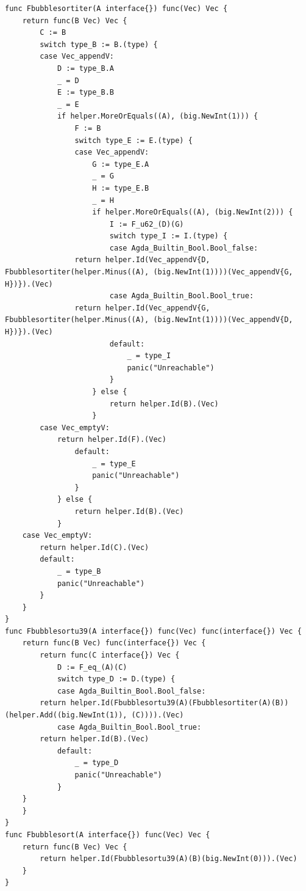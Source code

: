 \documentclass{VUMIFPSkursinis}
\begin{document}
\begin{lstlisting}[language=GoCust]
func Fbubblesortiter(A interface{}) func(Vec) Vec {
	return func(B Vec) Vec {
		C := B
		switch type_B := B.(type) {
		case Vec_appendV:
			D := type_B.A
			_ = D
			E := type_B.B
			_ = E
			if helper.MoreOrEquals((A), (big.NewInt(1))) {
				F := B
				switch type_E := E.(type) {
				case Vec_appendV:
					G := type_E.A
					_ = G
					H := type_E.B
					_ = H
					if helper.MoreOrEquals((A), (big.NewInt(2))) {
						I := F_u62_(D)(G)
						switch type_I := I.(type) {
						case Agda_Builtin_Bool.Bool_false:
				return helper.Id(Vec_appendV{D, Fbubblesortiter(helper.Minus((A), (big.NewInt(1))))(Vec_appendV{G, H})}).(Vec)
						case Agda_Builtin_Bool.Bool_true:
				return helper.Id(Vec_appendV{G, Fbubblesortiter(helper.Minus((A), (big.NewInt(1))))(Vec_appendV{D, H})}).(Vec)
						default:
							_ = type_I
							panic("Unreachable")
						}
					} else {
						return helper.Id(B).(Vec)
					}
		case Vec_emptyV:
			return helper.Id(F).(Vec)
				default:
					_ = type_E
					panic("Unreachable")
				}
			} else {
				return helper.Id(B).(Vec)
			}
	case Vec_emptyV:
		return helper.Id(C).(Vec)
		default:
			_ = type_B
			panic("Unreachable")
		}
	}
}
func Fbubblesortu39(A interface{}) func(Vec) func(interface{}) Vec {
	return func(B Vec) func(interface{}) Vec {
		return func(C interface{}) Vec {
			D := F_eq_(A)(C)
			switch type_D := D.(type) {
			case Agda_Builtin_Bool.Bool_false:
		return helper.Id(Fbubblesortu39(A)(Fbubblesortiter(A)(B))(helper.Add((big.NewInt(1)), (C)))).(Vec)
			case Agda_Builtin_Bool.Bool_true:
		return helper.Id(B).(Vec)
			default:
				_ = type_D
				panic("Unreachable")
			}
	}
	}
}
func Fbubblesort(A interface{}) func(Vec) Vec {
	return func(B Vec) Vec {
		return helper.Id(Fbubblesortu39(A)(B)(big.NewInt(0))).(Vec)
	}
}
\end{lstlisting}
\end{document}
